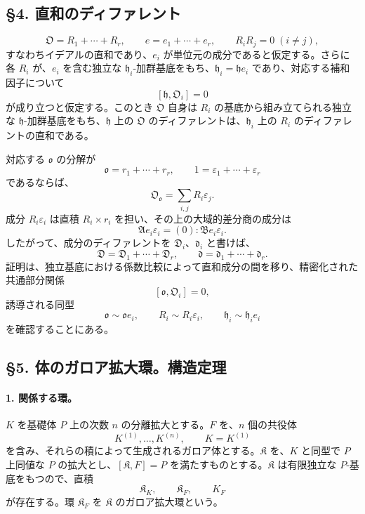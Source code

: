 \documentclass[11pt]{article}
\begin{document}
\subsection*{§4. 直和のディファレント}

\[
        \mathfrak O=R_1+\cdots+R_r,
        \qquad
        e=e_1+\cdots+e_r,
        \qquad
        R_iR_j=0\;(i\ne j),
\]
すなわちイデアルの直和であり、\(e_i\) が単位元の成分であると仮定する。さらに各 \(R_i\) が、\(e_i\) を含む独立な \(\mathfrak h_i\)-加群基底をもち、\(\mathfrak h_i=\mathfrak h e_i\) であり、対応する補和因子について
\[
        [\mathfrak h,\mathfrak O_i]=0
\]
が成り立つと仮定する。このとき \(\mathfrak O\) 自身は \(R_i\) の基底から組み立てられる独立な \(\mathfrak h\)-加群基底をもち、\(\mathfrak h\) 上の \(\mathfrak O\) のディファレントは、\(\mathfrak h_i\) 上の \(R_i\) のディファレントの直和である。

対応する \(\mathfrak o\) の分解が
\[
        \mathfrak o=r_1+
        \cdots+r_r,
        \qquad
        1=\varepsilon_1+
        \cdots+\varepsilon_r
\]
であるならば、
\[
        \mathfrak O_{\mathfrak o}=\sum_{i,j}R_i\varepsilon_j.
\]
成分 \(R_i\varepsilon_i\) は直積 \(R_i\times r_i\) を担い、その上の大域的差分商の成分は
\[
        \mathfrak A e_i\varepsilon_i=(0):\mathfrak B e_i\varepsilon_i.
\]
したがって、成分のディファレントを \(\mathfrak D_i\)、\(\mathfrak d_i\) と書けば、
\[
        \mathfrak D=\mathfrak D_1+
        \cdots+\mathfrak D_r,
        \qquad
        \mathfrak d=\mathfrak d_1+
        \cdots+\mathfrak d_r.
\]
証明は、独立基底における係数比較によって直和成分の間を移り、精密化された共通部分関係
\[
        [\mathfrak o,\mathfrak O_i]=0,
\]
誘導される同型
\[
        \mathfrak o\sim\mathfrak o e_i,
        \qquad
        R_i\sim R_i\varepsilon_i,
        \qquad
        \mathfrak h_i\sim \mathfrak h_i e_i
\]
を確認することにある。

\subsection*{§5. 体のガロア拡大環。構造定理}

\paragraph{1. 関係する環。}
\(K\) を基礎体 \(P\) 上の次数 \(n\) の分離拡大とする。\(F\) を、\(n\) 個の共役体
\[
        K^{(1)},\ldots,K^{(n)},
        \qquad K=K^{(1)}
\]
を含み、それらの積によって生成されるガロア体とする。\(\mathfrak K\) を、\(K\) と同型で \(P\) 上同値な \(P\) の拡大とし、\([\mathfrak K,F]=P\) を満たすものとする。\(\mathfrak K\) は有限独立な \(P\)-基底をもつので、直積
\[
        \mathfrak K_K,
        \qquad \mathfrak K_F,
        \qquad K_F
\]
が存在する。環 \(\mathfrak K_F\) を \(\mathfrak K\) のガロア拡大環という。
\end{document}
